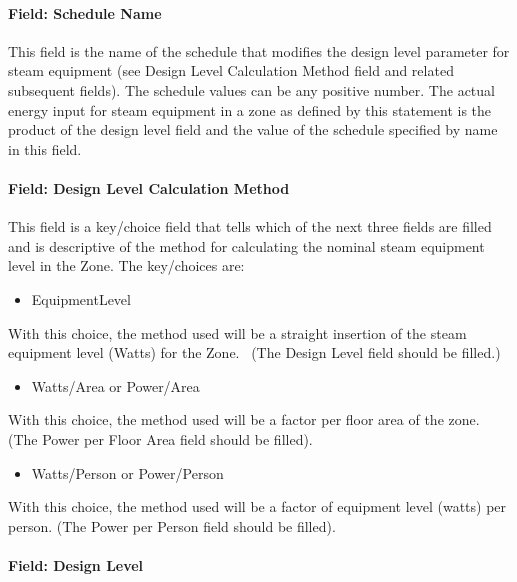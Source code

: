 \paragraph{Field: Schedule Name}\label{field-schedule-name-4-000}

This field is the name of the schedule that modifies the design level parameter for steam equipment (see Design Level Calculation Method field and related subsequent fields). The schedule values can be any positive number. The actual energy input for steam equipment in a zone as defined by this statement is the product of the design level field and the value of the schedule specified by name in this field.

\paragraph{Field: Design Level Calculation Method}\label{field-design-level-calculation-method-4}

This field is a key/choice field that tells which of the next three fields are filled and is descriptive of the method for calculating the nominal steam equipment level in the Zone. The key/choices are:

\begin{itemize}
\tightlist
\item
  EquipmentLevel
\end{itemize}

With this choice, the method used will be a straight insertion of the steam equipment level (Watts) for the Zone.~ (The Design Level field should be filled.)

\begin{itemize}
\tightlist
\item
  Watts/Area or Power/Area
\end{itemize}

With this choice, the method used will be a factor per floor area of the zone. (The Power per Floor Area field should be filled).

\begin{itemize}
\tightlist
\item
  Watts/Person or Power/Person
\end{itemize}

With this choice, the method used will be a factor of equipment level (watts) per person. (The Power per Person field should be filled).

\paragraph{Field: Design Level}\label{field-design-level-3}

